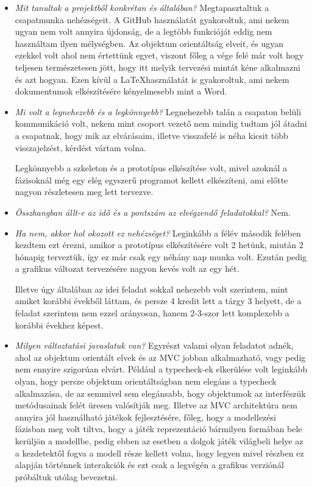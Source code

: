\begin{itemize}
\item \textit{Mit tanultak a projektből konkrétan és általában?} \newline
    Megtapasztaltuk a csapatmunka nehézségeit. A GitHub használatát gyakoroltuk, ami nekem ugyan nem volt annyira újdonság, de a legtöbb funkcióját eddig nem használtam ilyen mélységben. Az objektum orientáltság elveit, és ugyan ezekkel volt ahol nem értettünk egyet, viszont főleg a vége felé már volt hogy teljesen természetesen jött, hogy itt melyik tervezési mintát kéne alkalmazni és azt hogyan. Ezen kívül a \LaTeX használatát is gyakoroltuk, ami nekem dokumentumok elkészítésére kényelmesebb mint a Word.
\item \textit{Mi volt a legnehezebb és a legkönnyebb?} \newline
    Legnehezebb talán a csapaton belüli kommunikáció volt, nekem mint csoport vezető nem mindig tudtam jól átadni a csapatnak, hogy mik az elvárásaim, illetve visszafelé is néha kicsit több visszajelzést, kérdést vártam volna.
    
    Legkönnyebb a szkeleton és a prototípus elkészítése volt, mivel azoknál a fázisoknál még egy elég egyszerű programot kellett elkészíteni, ami előtte nagyon részletesen meg lett tervezve. 
\item \textit{Összhangban állt-e az idő és a pontszám az elvégzendő feladatokkal?} \newline
    Nem. 
\item \textit{Ha nem, akkor hol okozott ez nehézséget?} \newline
    Leginkább a félév második felében kezdtem ezt érezni, amikor a prototípus elkészítésére volt 2 hetünk, miután 2 hónapig terveztük, így ez már csak egy néhány nap munka volt. Ezután pedig a grafikus változat tervezésére nagyon kevés volt az egy hét.
    
    Illetve úgy általában az idei feladat sokkal nehezebb volt szerintem, mint amiket korábbi évekből láttam, és persze 4 kredit lett a tárgy 3 helyett, de a feladat szerintem nem ezzel arányosan, hanem 2-3-szor lett komplexebb a korábbi évekhez képest.
\item \textit{Milyen változtatási javaslatuk van?} \newline
    Egyrészt valami olyan feladatot adnék, ahol az objektum orientált elvek és az MVC jobban alkalmazható, vagy pedig nem ennyire szigorúan elvárt. Például a typecheck-ek elkerülése volt leginkább olyan, hogy persze objektum orientáltságban nem elegáns a typecheck alkalmazása, de az semmivel sem elegánsabb, hogy objektumok az interfészük metódusainak felét üresen valósítják meg. Illetve az MVC architektúra nem annyira jól használható játékok fejlesztésére, főleg, hogy a modellezési fázisban meg volt tiltva, hogy a játék reprezentáció bármilyen formában bele kerüljön a modellbe, pedig ebben az esetben a dolgok játék világbeli helye az a kezdetektől fogva a modell része kellett volna, hogy legyen mivel részben ez alapján történnek interakciók és ezt csak a legvégén a grafikus verziónál próbáltuk utólag bevezetni.
    

\end{itemize}
